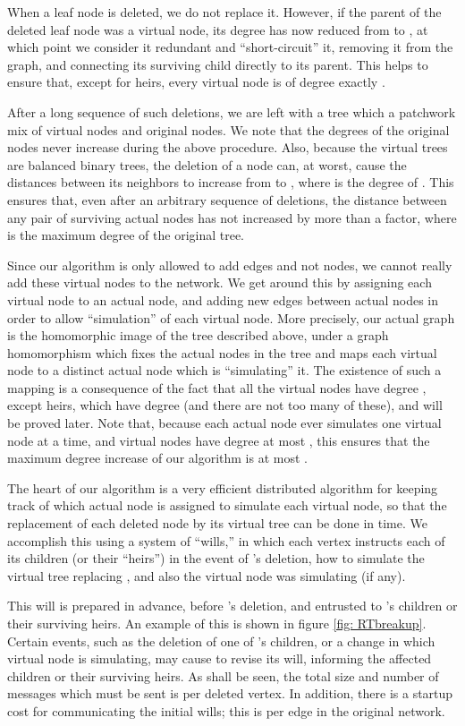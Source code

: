 \documentclass[11pt]{article}
\begin{document}
When a leaf node is deleted,
we do not replace it.  However, if the parent of the deleted 
leaf node was a virtual node, its degree has now reduced
from  to , at which point we consider it redundant
and ``short-circuit'' it, removing it from the graph,
and connecting its surviving child directly to its parent.
This helps to ensure that, except for heirs, every virtual
node is of degree exactly .

After a long sequence of such deletions, we are left with a
tree which a patchwork mix of virtual nodes and original nodes.
We note that the degrees of the original nodes never increase
during the above procedure.
Also, because the virtual trees are balanced binary trees, the deletion of
a node  can, at worst, cause the distances between its
neighbors to increase from  to , where 
 is the degree of .  This ensures that,
even after an arbitrary sequence of deletions, the distance
between any pair of surviving actual nodes has not increased
by more than a  factor, 
where  is the maximum degree of the original tree.

Since our algorithm is only allowed to add edges and not nodes, 
we cannot really add these virtual nodes to the network.
We get around this by assigning each virtual node to an actual
node, and adding new edges between actual nodes in order to 
allow ``simulation'' of each virtual node.  More precisely,
our actual graph is the homomorphic image of the tree
described above, under a graph homomorphism which fixes 
the actual nodes in the tree and maps each virtual node
to a distinct actual node which is ``simulating'' it.
The existence of such a mapping is a consequence of the 
fact that all the virtual nodes have degree , except heirs,
which have degree  (and there are not too many of these), 
and will be proved later.
Note that, because each actual node ever simulates one
virtual node at a time, and virtual nodes have degree at most ,
this ensures that the maximum degree increase of our algorithm
is at most .

The heart of our algorithm is a very efficient distributed algorithm 
for keeping track of which actual node is assigned to simulate
each virtual node, so that the replacement of each deleted node by
its virtual tree can be done in  time.  
We accomplish this using a system of ``wills,'' 
in which each vertex  instructs each of its children (or their ``heirs'') 
in the event of 's deletion, how to simulate the
virtual tree replacing , and also the virtual node  was
simulating (if any).

This will is prepared in advance, before 's deletion, and entrusted
to 's children or their surviving heirs.  An example of this is
shown in figure \ref{fig: RTbreakup}.  Certain events, such as the
deletion of one of 's children, or a change in which virtual node
 is simulating, may cause  to revise its will, informing the
affected children or their surviving heirs.  As shall be seen, the
total size and number of messages which must be sent is  per
deleted vertex. In addition, there is a startup cost for communicating
the initial wills; this is  per edge in the original network.
\end{document}
